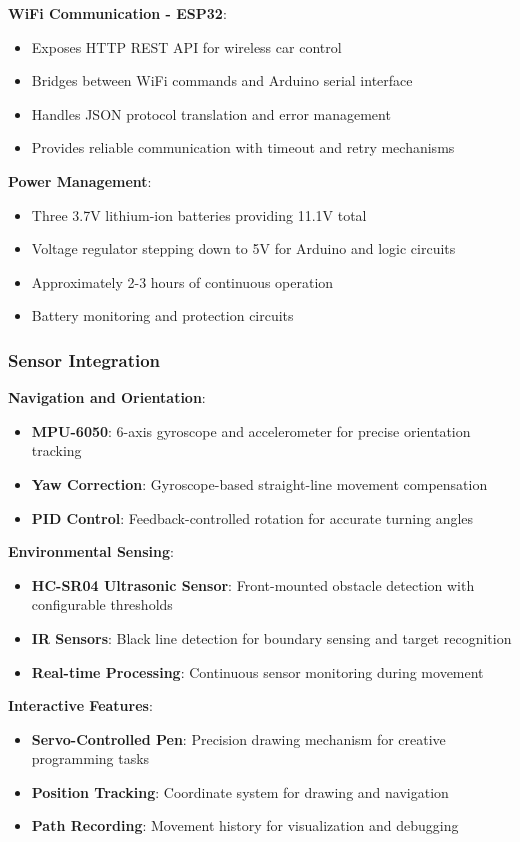 \textbf{WiFi Communication - ESP32}:
\begin{itemize}
    \item Exposes HTTP REST API for wireless car control
    \item Bridges between WiFi commands and Arduino serial interface
    \item Handles JSON protocol translation and error management
    \item Provides reliable communication with timeout and retry mechanisms
\end{itemize}

\textbf{Power Management}:
\begin{itemize}
    \item Three 3.7V lithium-ion batteries providing 11.1V total
    \item Voltage regulator stepping down to 5V for Arduino and logic circuits
    \item Approximately 2-3 hours of continuous operation
    \item Battery monitoring and protection circuits
\end{itemize}

\subsubsection{Sensor Integration}
\textbf{Navigation and Orientation}:
\begin{itemize}
    \item \textbf{MPU-6050}: 6-axis gyroscope and accelerometer for precise orientation tracking
    \item \textbf{Yaw Correction}: Gyroscope-based straight-line movement compensation
    \item \textbf{PID Control}: Feedback-controlled rotation for accurate turning angles
\end{itemize}

\textbf{Environmental Sensing}:
\begin{itemize}
    \item \textbf{HC-SR04 Ultrasonic Sensor}: Front-mounted obstacle detection with configurable thresholds
    \item \textbf{IR Sensors}: Black line detection for boundary sensing and target recognition
    \item \textbf{Real-time Processing}: Continuous sensor monitoring during movement
\end{itemize}

\textbf{Interactive Features}:
\begin{itemize}
    \item \textbf{Servo-Controlled Pen}: Precision drawing mechanism for creative programming tasks
    \item \textbf{Position Tracking}: Coordinate system for drawing and navigation
    \item \textbf{Path Recording}: Movement history for visualization and debugging
\end{itemize}


